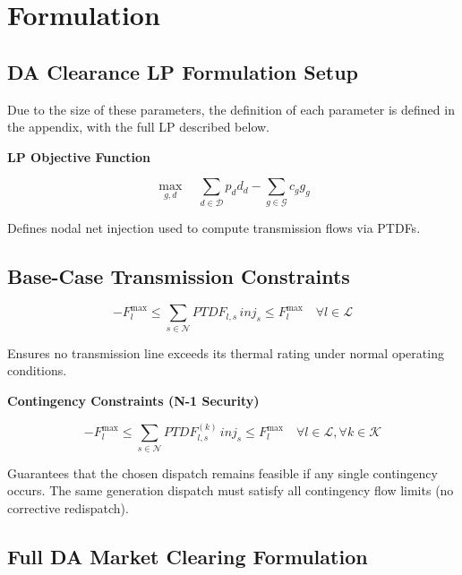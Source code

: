 \documentclass[11pt]{article}
\begin{document}

\section{Formulation}

\subsection{DA Clearance LP Formulation Setup}

Due to the size of these parameters, the definition of each parameter is defined in the appendix, with the full LP described below.

\textbf{LP Objective Function}

\begin{equation}
\max_{g,d} \quad
\sum_{d \in \mathcal{D}} p_d d_d
-
\sum_{g \in \mathcal{G}} c_g g_g
\end{equation}


Defines nodal net injection used to compute transmission flows via PTDFs.

\subsection{Base-Case Transmission Constraints}

\begin{equation}
- F_l^{\max}
\le
\sum_{s \in \mathcal{N}} PTDF_{l,s} \, inj_s
\le
F_l^{\max}
\quad \forall l \in \mathcal{L}
\end{equation}

 
Ensures no transmission line exceeds its thermal rating under normal operating conditions.

\textbf{Contingency Constraints (N-1 Security)}

\begin{equation}
- F_l^{\max}
\le
\sum_{s \in \mathcal{N}} PTDF_{l,s}^{(k)} \, inj_s
\le
F_l^{\max}
\quad \forall l \in \mathcal{L}, \forall k \in \mathcal{K}
\end{equation}

 
Guarantees that the chosen dispatch remains feasible if any single contingency occurs.  
The same generation dispatch must satisfy all contingency flow limits (no corrective redispatch).

\subsection{Full DA Market Clearing Formulation}
\end{document}
